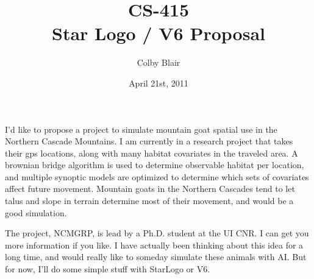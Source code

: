 \documentclass[12pt]{article}
\title{CS-415 \\
	Star Logo / V6 Proposal
}
\author{Colby Blair}
\date{April 21st, 2011}
\begin{document}
	\maketitle

\pagebreak

I'd like to propose a project to simulate mountain goat spatial use in the Northern Cascade Mountains. I am currently in a research project that takes their gps locations, along with many habitat covariates in the traveled area. A brownian bridge algorithm is used to determine observable habitat per location, and multiple synoptic models are optimized to determine which sets of covariates affect future movement. Mountain goats in the Northern Cascades tend to let talus and slope in terrain determine most of their movement, and would be a good simulation. 
 
The project, NCMGRP, is lead by a Ph.D. student at the UI CNR. I can get you more information if you like. I have actually been thinking about this idea for a long time, and would really like to someday simulate these animals with AI. But for now, I'll do some simple stuff with StarLogo or V6.
\end{document}
